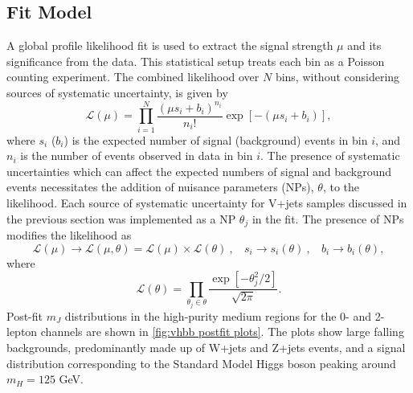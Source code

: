 \subsection{Fit Model}
A global profile likelihood fit is used to extract the signal strength $\mu$ and its significance from the data. This statistical setup treats each bin as a Poisson counting experiment. The combined likelihood over $N$ bins, without considering sources of systematic uncertainty, is given by
%
\begin{equation}
    \mathcal{L}(\mu) = \prod_{i=1}^N \frac{(\mu s_i + b_i)^{n_i}}{n_i!} \exp \left[ - (\mu s_i + b_i) \right],
\end{equation}
%
where $s_i$ ($b_i$) is the expected number of signal (background) events in bin $i$, and $n_i$ is the number of events observed in data in bin $i$. The presence of systematic uncertainties which can affect the expected numbers of signal and background events necessitates the addition of nuisance parameters (NPs), $\theta$, to the likelihood. Each source of systematic uncertainty for V+jets samples discussed in the previous section was implemented as a NP $\theta_j$ in the fit. The presence of NPs modifies the likelihood as 
%
\begin{equation}
    \mathcal{L}(\mu) \rightarrow \mathcal{L}(\mu, \theta) = \mathcal{L}(\mu) \times \mathcal{L}(\theta) ~,~~~~ s_i \rightarrow s_i(\theta) ~,~~~~ b_i \rightarrow b_i(\theta),
\end{equation}
%
where
%
\begin{equation}
    \mathcal{L}(\theta) = \prod_{\theta_j \in \theta} \frac{\exp\left[{-\theta_j^2/2}\right]}{\sqrt{2\pi}}.
\end{equation}
%
Post-fit $m_J$ distributions in the high-purity medium \pTV regions for the 0- and 2-lepton channels are shown in \cref{fig:vhbb postfit plots}. The plots show large falling backgrounds, predominantly made up of W+jets and Z+jets events, and a signal distribution corresponding to the Standard Model Higgs boson peaking around $m_H = 125$ GeV.
%
